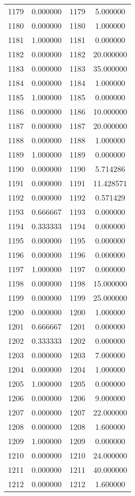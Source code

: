 \documentclass[12pt]{article}
\begin{document}
\begin{longtable}{@{}cccc@{}}
1179 & 0.000000 & 1179 & 5.000000 \\
1180 & 0.000000 & 1180 & 1.000000 \\
1181 & 1.000000 & 1181 & 0.000000 \\
1182 & 0.000000 & 1182 & 20.000000 \\
1183 & 0.000000 & 1183 & 35.000000 \\
1184 & 0.000000 & 1184 & 1.000000 \\
1185 & 1.000000 & 1185 & 0.000000 \\
1186 & 0.000000 & 1186 & 10.000000 \\
1187 & 0.000000 & 1187 & 20.000000 \\
1188 & 0.000000 & 1188 & 1.000000 \\
1189 & 1.000000 & 1189 & 0.000000 \\
1190 & 0.000000 & 1190 & 5.714286 \\
1191 & 0.000000 & 1191 & 11.428571 \\
1192 & 0.000000 & 1192 & 0.571429 \\
1193 & 0.666667 & 1193 & 0.000000 \\
1194 & 0.333333 & 1194 & 0.000000 \\
1195 & 0.000000 & 1195 & 0.000000 \\
1196 & 0.000000 & 1196 & 0.000000 \\
1197 & 1.000000 & 1197 & 0.000000 \\
1198 & 0.000000 & 1198 & 15.000000 \\
1199 & 0.000000 & 1199 & 25.000000 \\
1200 & 0.000000 & 1200 & 1.000000 \\
1201 & 0.666667 & 1201 & 0.000000 \\
1202 & 0.333333 & 1202 & 0.000000 \\
1203 & 0.000000 & 1203 & 7.000000 \\
1204 & 0.000000 & 1204 & 1.000000 \\
1205 & 1.000000 & 1205 & 0.000000 \\
1206 & 0.000000 & 1206 & 9.000000 \\
1207 & 0.000000 & 1207 & 22.000000 \\
1208 & 0.000000 & 1208 & 1.600000 \\
1209 & 1.000000 & 1209 & 0.000000 \\
1210 & 0.000000 & 1210 & 24.000000 \\
1211 & 0.000000 & 1211 & 40.000000 \\
1212 & 0.000000 & 1212 & 1.600000 \\

\end{longtable}
\end{document}
